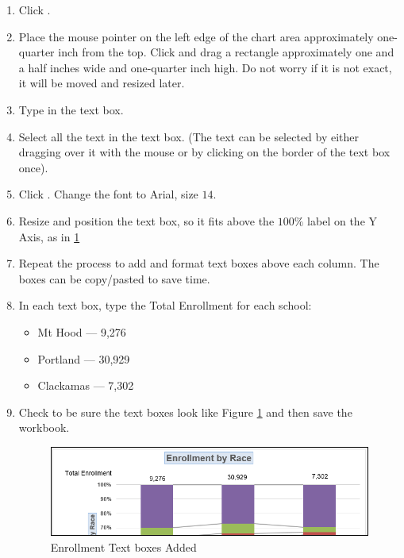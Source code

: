 \begin{enumbox}
	\begin{enumerate}
		\item Click .
		\item Place the mouse pointer on the left edge of the chart area approximately one-quarter inch from the top. Click and drag a rectangle approximately one and a half inches wide and one-quarter inch high. Do not worry if it is not exact, it will be moved and resized later.
		\item Type  in the text box.
		\item Select all the text in the text box. (The text can be selected by either dragging over it with the mouse or by clicking on the border of the text box once). 
		\item Click . Change the font to Arial, size $ 14 $.
		\item Resize and position the text box, so it fits above the $ 100\% $ label on the Y Axis, as in \ref{04:fig43}
		\item Repeat the process to add and format text boxes above each column. The boxes can be copy/pasted to save time.
		\item In each text box, type the Total Enrollment for each school:
	
		\begin{itemize}
			\item Mt Hood --- 9,276
			\item Portland --- 30,929
			\item Clackamas --- 7,302
		\end{itemize}
		\item Check to be sure the text boxes look like Figure \ref{04:fig43} and then save the  workbook.
	
		\begin{figure}[H]
			\centering
			\includegraphics[width=\maxwidth{.95\linewidth}]{gfx/ch04_fig43}
			\caption{Enrollment Text boxes Added}
			\label{04:fig43}
		\end{figure}
	

\end{enumerate}
\end{enumbox}
